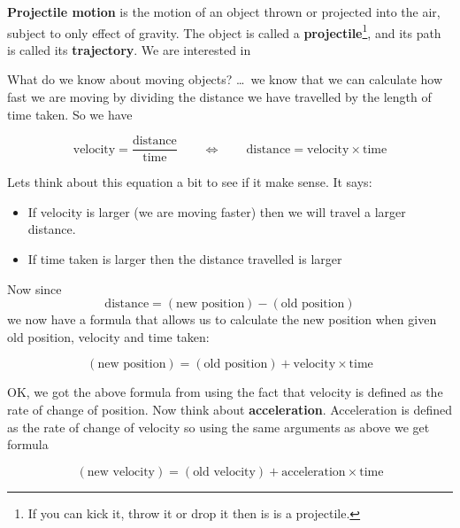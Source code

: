 \documentclass{coderdojo}
\begin{document}
{\bfseries Projectile motion} is the motion of an object thrown or projected into the air, subject to only effect of gravity. The object is called a {\bfseries projectile}\footnote{If you can kick it, throw it or drop it then is is a projectile.}, and its path is called its {\bfseries trajectory}. We are interested in 

What do we know about moving objects? \ldots\ we know that we can calculate how fast we are moving by dividing the distance we have travelled by the length of time taken. So we have 

\begin{tcolorbox}
\begin{equation*}
	\text{velocity} = \frac{\text{distance}}{\text{time}}
	\qquad\iff\qquad
	\text{distance}
	= {\text{velocity}}\times {\text{time}}
\end{equation*}
\end{tcolorbox}

Lets think about this equation a bit to see if it make sense.  It says:
\begin{itemize}
\item
If velocity is larger (we are moving faster) then we will travel a larger distance. 
\dotfill \tickYes
\item
If time taken is larger then the distance travelled is larger
\dotfill \tickYes

\end{itemize}

Now since 
\[
	\text{distance} = (\text{new position}) - (\text{old position})
\]
we now have a formula that allows us to calculate the new position when given old position, velocity and time taken:

\begin{tcolorbox}
\begin{equation}
(\text{new position}) =  (\text{old position}) +  {\text{velocity}}\times {\text{time}}
\label{eq:position}
\end{equation}
\end{tcolorbox}

OK, we got the above formula from using the fact that velocity is defined as the rate of change of position. Now think about {\bf acceleration}. Acceleration is defined as the rate of change of velocity so using the same arguments as above we get formula

\begin{tcolorbox}
\begin{equation}
(\text{new velocity}) =  (\text{old velocity}) +  {\text{acceleration}}\times {\text{time}}
\label{eq:velocity}
\end{equation}
\end{tcolorbox}
\end{document}
